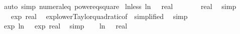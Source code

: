 \begin{isabellebody}
\ {\isacharparenleft}{\kern0pt}auto\ simp{\isacharcolon}{\kern0pt}\ numeral{\isacharunderscore}{\kern0pt}{}{\isacharunderscore}{\kern0pt}eq{\isacharunderscore}{\kern0pt}{}\ power{}{\isacharunderscore}{\kern0pt}eq{\isacharunderscore}{\kern0pt}square{\isacharparenright}{\kern0pt}%
\endisatagproof
{\isafoldproof}%
%
\isadelimproof
\isanewline
%
\endisadelimproof
\isanewline
{}\isamarkupfalse%
\ ln{\isacharunderscore}{\kern0pt}{}{\isacharunderscore}{\kern0pt}less{\isacharunderscore}{\kern0pt}{}{\isacharcolon}{\kern0pt}\ {\isachardoublequoteopen}ln\ {}\ {\isacharless}{\kern0pt}\ {\isacharparenleft}{\kern0pt}{}{\isacharcolon}{\kern0pt}{\isacharcolon}{\kern0pt}real{\isacharparenright}{\kern0pt}{\isachardoublequoteclose}\isanewline
%
\isadelimproof
%
\endisadelimproof
%
\isatagproof
{}\isamarkupfalse%
\ {\isacharminus}{\kern0pt}\isanewline
\ \ \isamarkupfalse%
\ {\isachardoublequoteopen}{}\ {\isacharless}{\kern0pt}\ {}{\isacharslash}{\kern0pt}{\isacharparenleft}{\kern0pt}{}{\isacharcolon}{\kern0pt}{\isacharcolon}{\kern0pt}real{\isacharparenright}{\kern0pt}{\isachardoublequoteclose}\ \isamarkupfalse%
\ simp\isanewline
\ \ \isamarkupfalse%
\ \isamarkupfalse%
\ {\isachardoublequoteopen}{}{\isacharslash}{\kern0pt}{}\ {\isasymle}\ exp\ {\isacharparenleft}{\kern0pt}{}{\isacharcolon}{\kern0pt}{\isacharcolon}{\kern0pt}real{\isacharparenright}{\kern0pt}{\isachardoublequoteclose}\ \isamarkupfalse%
\ exp{\isacharunderscore}{\kern0pt}lower{\isacharunderscore}{\kern0pt}Taylor{\isacharunderscore}{\kern0pt}quadratic{\isacharbrackleft}{\kern0pt}of\ {}{\isacharcomma}{\kern0pt}\ simplified{\isacharbrackright}{\kern0pt}\ \isamarkupfalse%
\ simp\isanewline
\ \ \isamarkupfalse%
\ \isamarkupfalse%
\ {\isachardoublequoteopen}exp\ {\isacharparenleft}{\kern0pt}ln\ {}{\isacharparenright}{\kern0pt}\ {\isacharless}{\kern0pt}\ exp\ {\isacharparenleft}{\kern0pt}{}{\isacharcolon}{\kern0pt}{\isacharcolon}{\kern0pt}real{\isacharparenright}{\kern0pt}{\isachardoublequoteclose}\ \isamarkupfalse%
\ simp\isanewline
\ \ \isamarkupfalse%
\ {\isachardoublequoteopen}ln\ {}\ {\isacharless}{\kern0pt}\ {\isacharparenleft}{\kern0pt}{}{\isacharcolon}{\kern0pt}{\isacharcolon}{\kern0pt}real{\isacharparenright}{\kern0pt}{\isachardoublequoteclose}\ \isamarkupfalse%

\end{isabellebody}
